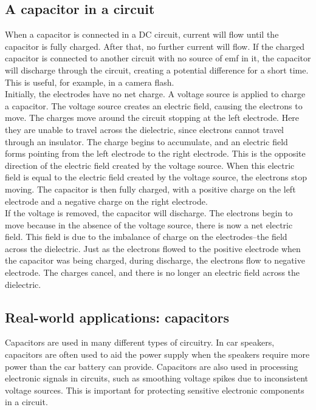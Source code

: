 \subsection{A capacitor in a circuit}
When a capacitor is connected in a DC circuit, current will flow
until the capacitor is fully charged. After that, no further
current will flow. If the charged capacitor is connected to
another circuit with no source of emf in it, the capacitor will
discharge through the circuit, creating a potential difference for
a short time. This is useful, for example, in a camera flash.\\
 
Initially, the electrodes have no net charge.  A
voltage source is applied to charge a capacitor.  The voltage source creates an electric
field, causing the electrons to move. The charges move around the
circuit stopping at the left electrode.  Here they are unable to
travel across the dielectric, since electrons cannot travel
through an insulator. The charge begins to accumulate, and an
electric field forms pointing from the left electrode to the right
electrode.  This is the opposite direction of the electric field
created by the voltage source. When this electric field is equal
to the electric field created by the voltage source, the electrons
stop moving.  The capacitor is then fully charged, with a positive
charge on the left electrode and a negative charge on the right
electrode.\\
 
If the voltage is removed, the capacitor will discharge.  The
electrons begin to move because in the absence of the voltage
source, there is now a net electric field.  This field is due to
the imbalance of charge on the electrodes--the field across the
dielectric. Just as the electrons flowed to the positive electrode
when the capacitor was being charged, during discharge, the
electrons flow to negative electrode.  The charges cancel, and
there is no longer an electric field across the dielectric.

\subsection{Real-world applications: capacitors}
Capacitors are used in many different types of circuitry.  In car
speakers, capacitors are often used to aid the power supply when
the speakers require more power than the car battery can provide.
Capacitors are also used in processing electronic signals in
circuits, such as smoothing voltage spikes due to inconsistent
voltage sources. This is important for protecting sensitive electronic components in a circuit. 

